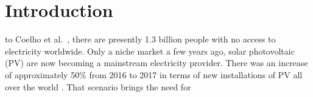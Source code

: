 \documentclass[journal]{IEEEtran}
\begin{document}
\section{Introduction}
% 
% 
% 
% 
 to Coelho et al.~\cite{Coelho}, there are presently 1.3 billion people with no access to electricity worldwide. 
%
Only a niche market a few years ago, solar photovoltaic (PV) are now becoming a mainstream electricity provider. 
There was an increase of approximately 50\% from 2016 to 2017 in terms of new installations of PV all over the world \cite{EPIA}. That scenario brings the need for 
% 
%
\end{document}
